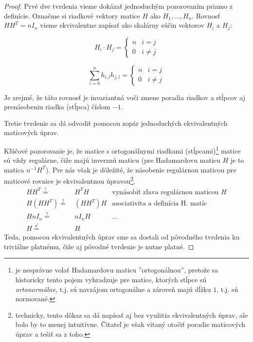 \begin{proof}
Prvé dve tvrdenia vieme dokázať jednoduchým pozorovaním priamo z definície. Označme si riadkové vektory matice $H$ ako $H_1, \dots, H_n$. Rovnosť $HH^T = nI_n$ vieme ekvivalentne zapísať ako skalárny súčin vektorov $H_i$ a $H_j$:

\noindent\begin{minipage}{.5\linewidth}
	\begin{equation*}
		H_i \cdot H_j = \begin{cases}
				   n               & i = j\\
				   0              & i \neq j
			   \end{cases}
	\end{equation*}
\end{minipage}
\noindent\begin{minipage}{.5\linewidth}
	\begin{equation*}
		\sum_{l=0}^{n} h_{i, l} h_{j, l} = \begin{cases}
				   n               & i = j\\
				   0              & i \neq j
			   \end{cases}
	\end{equation*}
\end{minipage}

Je zrejmé, že táto rovnosť je invariantná voči zmene poradia riadkov a stĺpcov aj prenásobeniu riadka (stĺpca) číslom $-1$.

Tretie tvrdenie sa dá odvodiť pomocou zopár jednoduchých ekvivalentných maticových úprav.

Kľúčové pozorovanie je, že matice s ortogonálnymi riadkami (stĺpcami)\footnote{je nesprávne volať Hadamardovu maticu ''ortogonálnou'', pretože sa historicky tento pojem vyhradzuje pre matice, ktorých stĺpce sú \emph{ortonormálne}, t.j. sú navzájom ortogonálne a zároveň majú dĺžku $1$, t.j. sú normované.} matice sú vždy regulárne, čiže majú inverznú maticu (pre Hadamardovu maticu $H$ je to matica $n^{-1} H^T$).
Pre nás však je dôležité, že násobenie regulárnou maticou pre maticové rovnice je ekvivalentnou úpravou\footnote{technicky, tento dôkaz sa dá napísať aj bez využitia ekvivalentných úprav, ale bolo by to menej intuitívne. Čitateľ je však vítaný otočiť poradie maticových úprav a tešiť sa z toho.}.
\begin{align*}
    HH^T \overset{?}{=}&~ H^TH&\text{vynásobiť zľava regulárnou maticou $H$}\\
    H(HH^T) \overset{?}{=}&~ (HH^T)H&\text{asociativita a definícia H. matíc}\\
    HnI_n \overset{?}{=}&~ nI_nH&\text{...}\\
    H \overset{\checkmark}{=}&~ H&\text{}
\end{align*}
Teda, pomocou ekvivalentných úprav sme sa dostali od pôvodného tvrdenia ku triviálne platnému, čiže aj pôvodné tvrdenie je nutne platné.
\end{proof}

